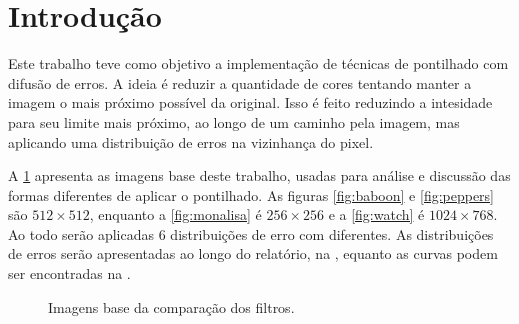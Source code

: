 \section{Introdução}

Este trabalho teve como objetivo a implementação de técnicas de pontilhado com difusão de erros. A ideia é reduzir a quantidade de cores tentando manter a imagem o mais próximo possível da original. Isso é feito reduzindo a intesidade para seu limite mais próximo, ao longo de um caminho pela imagem, mas aplicando uma distribuição de erros na vizinhança do pixel.

A \cref{fig:base} apresenta as imagens base deste trabalho, usadas para análise e discussão das formas diferentes de aplicar o pontilhado. As figuras \ref{fig:baboon} e \ref{fig:peppers} são $512 \times 512$, enquanto a \cref{fig:monalisa} é $256 \times 256$ e a \cref{fig:watch} é $1024 \times 768$. Ao todo serão aplicadas 6 distribuições de erro com  diferentes. As distribuições de erros serão apresentadas ao longo do relatório, na , equanto as curvas podem ser encontradas na .

\begin{figure}[H]
    \centering
    

    \caption{Imagens base da comparação dos filtros.}
    \label{fig:base}
\end{figure}
